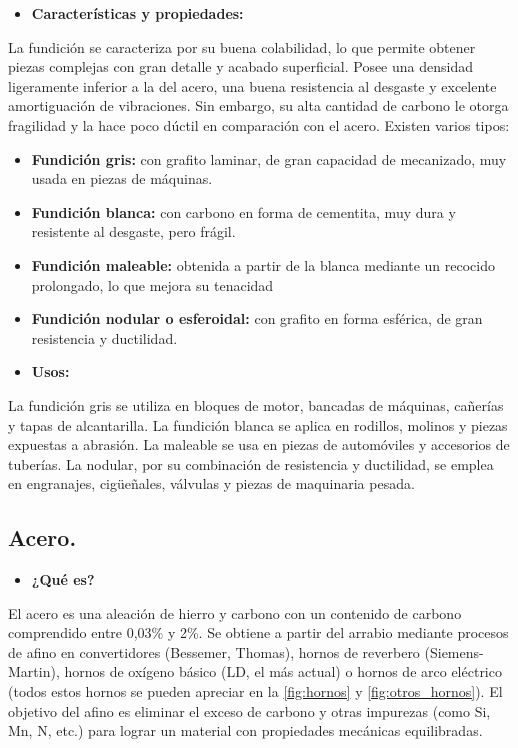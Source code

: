 \documentclass[12pt,a4paper]{article}
\begin{document}
\begin{itemize}
    \item \textbf{Características y propiedades:}
\end{itemize}

La fundición se caracteriza por su buena colabilidad, lo que permite obtener piezas complejas con gran detalle y acabado superficial. Posee una densidad ligeramente inferior a la del acero, una buena resistencia al desgaste y excelente amortiguación de vibraciones. Sin embargo, su alta cantidad de carbono le otorga fragilidad y la hace poco dúctil en comparación con el acero.
Existen varios tipos:

\begin{itemize}
    \item \textbf{Fundición gris:} con grafito laminar, de gran capacidad de mecanizado, muy usada en piezas de máquinas.
    \item \textbf{Fundición blanca:} con carbono en forma de cementita, muy dura y resistente al desgaste, pero frágil.
    \item \textbf{Fundición maleable:} obtenida a partir de la blanca mediante un recocido prolongado, lo que mejora su tenacidad
    \item\textbf{Fundición nodular o esferoidal:} con grafito en forma esférica, de gran resistencia y ductilidad.
    \item \textbf{Usos:}
\end{itemize}

La fundición gris se utiliza en bloques de motor, bancadas de máquinas, cañerías y tapas de alcantarilla. La fundición blanca se aplica en rodillos, molinos y piezas expuestas a abrasión. La maleable se usa en piezas de automóviles y accesorios de tuberías. La nodular, por su combinación de resistencia y ductilidad, se emplea en engranajes, cigüeñales, válvulas y piezas de maquinaria pesada.

\subsection{Acero.}
\begin{itemize}
    \item \textbf{¿Qué es?}
\end{itemize}

El acero es una aleación de hierro y carbono con un contenido de carbono comprendido entre 0,03\% y 2\%. Se obtiene a partir del arrabio mediante procesos de afino en convertidores (Bessemer, Thomas), hornos de reverbero (Siemens-Martin), hornos de oxígeno básico (LD, el más actual) o hornos de arco eléctrico (todos estos hornos se pueden apreciar en la \autoref{fig:hornos} y \autoref{fig:otros_hornos}). El objetivo del afino es eliminar el exceso de carbono y otras impurezas (como Si, Mn, N, etc.) para lograr un material con propiedades mecánicas equilibradas.
\end{document}
